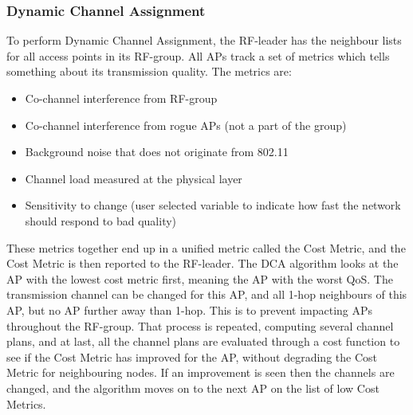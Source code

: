 \subsubsection{Dynamic Channel Assignment}
To perform Dynamic Channel Assignment, the RF-leader has the neighbour lists for all access points in 
its RF-group. All APs track a set of metrics which tells something about its transmission quality. The metrics are: 
\begin{itemize}
	\item Co-channel interference from RF-group
	\item Co-channel interference from rogue APs (not a part of the group)
	\item Background noise that does not originate from 802.11
	\item Channel load measured at the physical layer
	\item Sensitivity to change (user selected variable to indicate how fast the network should respond to bad quality)
\end{itemize}
These metrics together end up in a unified metric called the Cost Metric, and the Cost Metric is then reported to the RF-leader. 
The DCA algorithm looks at the AP with the lowest cost metric first, meaning the AP with the worst QoS. The transmission channel can be changed for
this AP, and all 1-hop neighbours of this AP, but no AP further away than 1-hop. This is to prevent impacting APs throughout the RF-group.
That process is repeated, computing several channel plans, and at last, all the channel plans are evaluated through a cost function
to see if the Cost Metric has improved for the AP, without degrading the Cost Metric for neighbouring nodes. If an improvement is seen
then the channels are changed, and the algorithm moves on to the next AP on the list of low Cost Metrics.  

